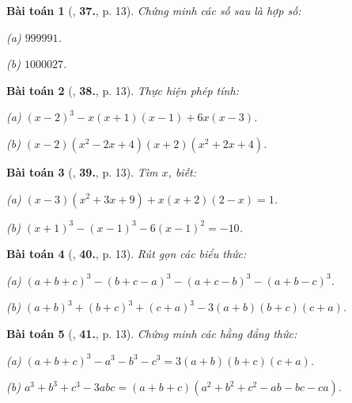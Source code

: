 \documentclass{article}
\numberwithin{equation}{section}
\newtheorem{baitoan}{Bài toán}[section]
\begin{document}
\begin{baitoan}[\cite{Binh_Toan_8_tap_1}, \textbf{37.}, p. 13]
	Chứng minh các số sau là hợp số:
	\begin{enumerate*}
		\item[(a)] $999991$.
		\item[(b)] $1000027$.
	\end{enumerate*}
\end{baitoan}

\begin{baitoan}[\cite{Binh_Toan_8_tap_1}, \textbf{38.}, p. 13]
	Thực hiện phép tính:
	
	\begin{enumerate*}
		\item[(a)] $(x - 2)^3 - x(x + 1)(x - 1) + 6x(x - 3)$.
		\item[(b)] $(x - 2)(x^2 - 2x + 4)(x + 2)(x^2 + 2x + 4)$.
	\end{enumerate*}
\end{baitoan}

\begin{baitoan}[\cite{Binh_Toan_8_tap_1}, \textbf{39.}, p. 13]
	Tìm $x$, biết:
	\begin{enumerate*}
		\item[(a)] $(x - 3)(x^2 + 3x + 9) + x(x + 2)(2 - x) = 1$.
		\item[(b)] $(x + 1)^3 - (x - 1)^3 - 6(x - 1)^2 = -10$.
	\end{enumerate*}
\end{baitoan}

\begin{baitoan}[\cite{Binh_Toan_8_tap_1}, \textbf{40.}, p. 13]
	Rút gọn các biểu thức:
	\begin{enumerate*}
		\item[(a)] $(a + b + c)^3 - (b + c - a)^3 - (a + c - b)^3 - (a + b - c)^3$.
		\item[(b)] $(a + b)^3 + (b + c)^3 + (c + a)^3 - 3(a + b)(b + c)(c + a)$.
	\end{enumerate*}
\end{baitoan}

\begin{baitoan}[\cite{Binh_Toan_8_tap_1}, \textbf{41.}, p. 13]
	Chứng minh các hằng đẳng thức:
	\begin{enumerate*}
		\item[(a)] $(a + b + c)^3 - a^3 - b^3 - c^3 = 3(a + b)(b + c)(c + a)$.
		\item[(b)] $a^3 + b^3 + c^3 - 3abc = (a + b + c)(a^2 + b^2 + c^2 - ab - bc - ca)$.
	\end{enumerate*}
\end{baitoan}
\end{document}
